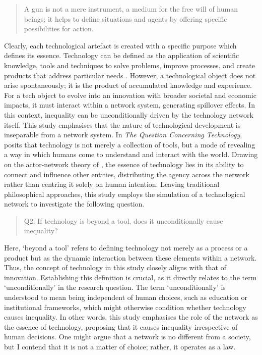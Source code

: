 \documentclass[12pt]{article}
\begin{document}
\begin{quote}
A gun is not a mere instrument, a medium for the free will of human beings; it helps to define situations and agents by offering specific possibilities for action.
\end{quote}

Clearly, each technological artefact is created with a specific purpose which defines its essence. Technology can be defined as the application of scientific knowledge, tools and techniques to solve problems, improve processes, and create products that address particular needs \parencite{arthur2009nature}. However, a technological object does not arise spontaneously; it is the product of accumulated knowledge and experience. For a tech object to evolve into an innovation with broader societal and economic impacts, it must interact within a network system, generating spillover effects. In this context, inequality can be unconditionally driven by the technology network itself. This study emphasises that the nature of technological development is inseparable from a network system. In \textit{The Question Concerning Technology}, \textcite{heidegger2009question} posits that technology is not merely a collection of tools, but a mode of revealing a way in which humans come to understand and interact with the world. Drawing on the actor-network theory of \textcite{latour2007reassembling}, the essence of technology lies in its ability to connect and influence other entities, distributing the agency across the network rather than centring it solely on human intention. Leaving traditional philosophical approaches, this study employs the simulation of a technological network to investigate the following question.
\begin{quote}
    Q2: If technology is beyond a tool, does it unconditionally cause inequality?
\end{quote}
Here, `beyond a tool' refers to defining technology not merely as a process or a product but as the dynamic interaction between these elements within a network. Thus, the concept of technology in this study closely aligns with that of innovation. Establishing this definition is crucial, as it directly relates to the term `unconditionally' in the research question. The term `unconditionally' is understood to mean being independent of human choices, such as education or institutional frameworks, which might otherwise condition whether technology causes inequality. In other words, this study emphasises the role of the network as the essence of technology, proposing that it causes inequality irrespective of human decisions. One might argue that a network is no different from a society, but I contend that it is not a matter of choice; rather, it operates as a law.
\end{document}
